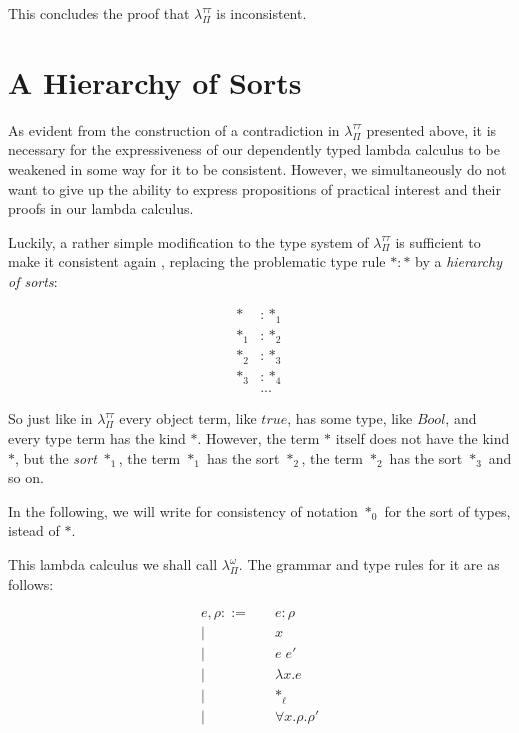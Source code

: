 \documentclass[runningheads]{llncs}
\begin{document}
This concludes the proof that $\lambda_\Pi^{\tau \tau}$ is inconsistent.

\section{A Hierarchy of Sorts}

As evident from the construction of a contradiction in $\lambda_\Pi^{\tau \tau}$
presented above, it is necessary for the expressiveness of our dependently typed
lambda calculus to be weakened in some way for it to be consistent. However, we
simultaneously do not want to give up the ability to express propositions of
practical interest and their proofs in our lambda calculus.

Luckily, a rather simple modification to the type system of $\lambda_\Pi^{\tau
\tau}$ is sufficient to make it consistent again \cite{lof1973intuitionistic}
\cite{coquand1986analysis}, replacing the problematic type rule $\ast : \ast$ by
a \textit{hierarchy of sorts}:

$$
\begin{aligned}
\ast   & : \ast_1\\
\ast_1 & : \ast_2\\
\ast_2 & : \ast_3\\
\ast_3 & : \ast_4\\
& ...
\end{aligned}
$$

So just like in $\lambda_\Pi^{\tau \tau}$ every object term, like $true$, has
some type, like $Bool$, and every type term has the kind $\ast$. However, the
term $\ast$ itself does not have the kind $\ast$, but the \textit{sort}
$\ast_1$, the term $\ast_1$ has the sort $\ast_2$, the term $\ast_2$ has the
sort $\ast_3$ and so on.

In the following, we will write for consistency of notation $\ast_0$ for the
sort of types, istead of $\ast$.

This lambda calculus we shall call $\lambda_\Pi^\omega$. The grammar and type
rules for it are as follows:

$$
\begin{aligned}
e , \rho ::= & \quad e : \rho\\
           | & \quad x\\
           | & \quad e \; e'\\
           | & \quad \lambda x . e\\
           | & \quad \ast_\ell\\
           | & \quad \forall x . \rho . \rho'
\end{aligned}
$$
\end{document}
